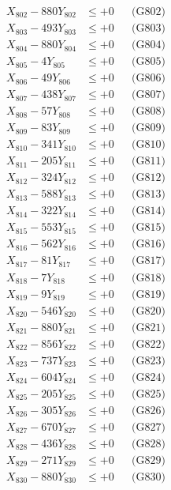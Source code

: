 \documentclass[a4paper,10pt]{article}
\begin{document}
{\begin{align}
X_{802} - 880Y_{802} &\leq +0 && \text{(G802)} \\
X_{803} - 493Y_{803} &\leq +0 && \text{(G803)} \\
X_{804} - 880Y_{804} &\leq +0 && \text{(G804)} \\
X_{805} - 4Y_{805} &\leq +0 && \text{(G805)} \\
X_{806} - 49Y_{806} &\leq +0 && \text{(G806)} \\
X_{807} - 438Y_{807} &\leq +0 && \text{(G807)} \\
X_{808} - 57Y_{808} &\leq +0 && \text{(G808)} \\
X_{809} - 83Y_{809} &\leq +0 && \text{(G809)} \\
X_{810} - 341Y_{810} &\leq +0 && \text{(G810)} \\
\allowbreak
X_{811} - 205Y_{811} &\leq +0 && \text{(G811)} \\
X_{812} - 324Y_{812} &\leq +0 && \text{(G812)} \\
X_{813} - 588Y_{813} &\leq +0 && \text{(G813)} \\
X_{814} - 322Y_{814} &\leq +0 && \text{(G814)} \\
X_{815} - 553Y_{815} &\leq +0 && \text{(G815)} \\
X_{816} - 562Y_{816} &\leq +0 && \text{(G816)} \\
X_{817} - 81Y_{817} &\leq +0 && \text{(G817)} \\
X_{818} - 7Y_{818} &\leq +0 && \text{(G818)} \\
X_{819} - 9Y_{819} &\leq +0 && \text{(G819)} \\
X_{820} - 546Y_{820} &\leq +0 && \text{(G820)} \\
\allowbreak
X_{821} - 880Y_{821} &\leq +0 && \text{(G821)} \\
X_{822} - 856Y_{822} &\leq +0 && \text{(G822)} \\
X_{823} - 737Y_{823} &\leq +0 && \text{(G823)} \\
X_{824} - 604Y_{824} &\leq +0 && \text{(G824)} \\
X_{825} - 205Y_{825} &\leq +0 && \text{(G825)} \\
X_{826} - 305Y_{826} &\leq +0 && \text{(G826)} \\
X_{827} - 670Y_{827} &\leq +0 && \text{(G827)} \\
X_{828} - 436Y_{828} &\leq +0 && \text{(G828)} \\
X_{829} - 271Y_{829} &\leq +0 && \text{(G829)} \\
X_{830} - 880Y_{830} &\leq +0 && \text{(G830)} \\

\end{align}}
\end{document}
